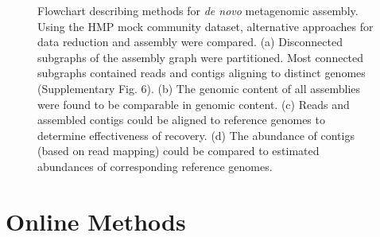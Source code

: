 \documentclass{nature}%
\begin{document}
\newpage
\newpage

\begin{figure}[ht!]
\caption{Flowchart describing methods for \emph{de novo} metagenomic assembly.   Using the HMP
mock community dataset, alternative approaches for data reduction and assembly were compared.  
(a) Disconnected subgraphs of the assembly graph were partitioned.  Most connected subgraphs contained 
reads and contigs aligning to distinct genomes (Supplementary Fig. 6). (b) The genomic content of all assemblies were 
found to be comparable in genomic content.  (c)  Reads and assembled contigs could be aligned to reference 
genomes to determine effectiveness of recovery. (d) The abundance of contigs (based on read mapping) could 
be compared to estimated abundances of corresponding reference genomes.} 
\label{flowchart}
\end{figure}


\newpage

\newpage
\clearpage

\section*{Online Methods}
\end{document}
